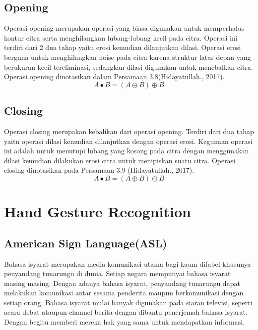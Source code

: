 \subsection{Opening}
Operasi opening merupakan operasi yang biasa digunakan untuk memperhalus kontur citra serta menghilangkan lubang-lubang kecil pada citra. Operasi ini terdiri dari 2 dua tahap yaitu erosi kemudian dilanjutkan dilasi. Operasi erosi berguna untuk menghilangkan noise pada citra karena struktur latar depan yang berukuran kecil tereliminasi, sedangkan dilasi digunakan untuk menebalkan citra. Operasi opening dinotasikan dalam Persamaan 3.8(Hidayatullah., 2017).
\begin{equation}
A \bullet B = (A \ominus B) \oplus B
\end{equation}

\subsection{Closing}
Operasi closing merupakan kebalikan dari operasi opening. Terdiri dari dua tahap yaitu operasi dilasi kemudian dilanjutkan dengan operasi erosi. Kegunaan operasi ini adalah untuk menutupi lubang yang kosong pada citra dengan menggunakan dilasi kemudian dilakukan erosi citra untuk menipiskan suatu citra. Operasi closing dinotasikan pada Persamaan 3.9 (Hidayatullah., 2017).
\begin{equation}
A \bullet B = (A \oplus B) \ominus B
\end{equation}
\section{Hand Gesture Recognition}

\subsection{American Sign Language(ASL)}
Bahasa isyarat merupakan media komunikasi utama bagi kaum difabel khusunya penyandang tunarungu di dunia. Setiap negara mempunyai bahasa isyarat masing masing. Dengan adanya bahasa isyarat, penyandang tunarungu dapat melakukan komunikasi antar sesama penderita maupun berkomunikasi dengan setiap orang. Bahasa isyarat mulai banyak digunakan pada siaran televisi, seperti acara debat ataupun channel berita dengan dibantu penerjemah bahasa isyarat. Dengan begitu memberi mereka hak yang sama untuk mendapatkan informasi. 

